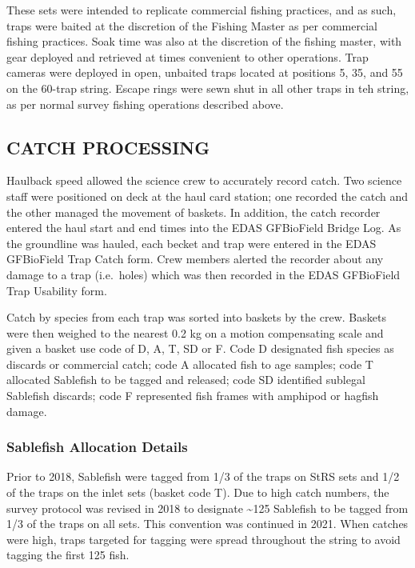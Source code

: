 \documentclass[12pt]{article}\usepackage[]{graphicx}\usepackage[]{color}
\begin{document}
These sets were intended to replicate commercial fishing practices, and as such, traps were baited at the discretion of the Fishing Master as per commercial fishing practices. Soak time was also at the discretion of the fishing master, with gear deployed and retrieved at times convenient to other operations. Trap cameras were deployed in open, unbaited traps located at positions 5, 35, and 55 on the 60-trap string. Escape rings were sewn shut in all other traps in teh string, as per normal survey fishing operations described above.

\hypertarget{catch-processing}{%
\subsection{CATCH PROCESSING}\label{catch-processing}}

Haulback speed allowed the science crew to accurately record catch. Two science staff were positioned on deck at the haul card station; one recorded the catch and the other managed the movement of baskets. In addition, the catch recorder entered the haul start and end times into the EDAS GFBioField Bridge Log. As the groundline was hauled, each becket and trap were entered in the EDAS GFBioField Trap Catch form. Crew members alerted the recorder about any damage to a trap (i.e.~holes) which was then recorded in the EDAS GFBioField Trap Usability form.

Catch by species from each trap was sorted into baskets by the crew. Baskets were then weighed to the nearest 0.2 kg on a motion compensating scale and given a basket use code of D, A, T, SD or F. Code D designated fish species as discards or commercial catch; code A allocated fish to age samples; code T allocated Sablefish to be tagged and released; code SD identified sublegal Sablefish discards; code F represented fish frames with amphipod or hagfish damage.

\hypertarget{sablefish-allocation-details}{%
\subsubsection{Sablefish Allocation Details}\label{sablefish-allocation-details}}

Prior to 2018, Sablefish were tagged from 1/3 of the traps on StRS sets and 1/2 of the traps on the inlet sets (basket code T). Due to high catch numbers, the survey protocol was revised in 2018 to designate \textasciitilde125 Sablefish to be tagged from 1/3 of the traps on all sets. This convention was continued in 2021. When catches were high, traps targeted for tagging were spread throughout the string to avoid tagging the first 125 fish.
\end{document}
